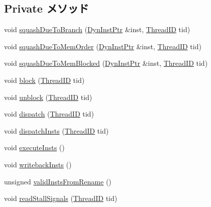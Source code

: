 \subsection*{Private メソッド}
\begin{DoxyCompactItemize}
\item 
void \hyperlink{classDefaultIEW_a7312a115c34dfbb21d18b6d85fc46fb9}{squashDueToBranch} (\hyperlink{classDefaultIEW_a028ce10889c5f6450239d9e9a7347976}{DynInstPtr} \&inst, \hyperlink{base_2types_8hh_ab39b1a4f9dad884694c7a74ed69e6a6b}{ThreadID} tid)
\item 
void \hyperlink{classDefaultIEW_a581b3c0199d9fc6283bdc7dbcab26e45}{squashDueToMemOrder} (\hyperlink{classDefaultIEW_a028ce10889c5f6450239d9e9a7347976}{DynInstPtr} \&inst, \hyperlink{base_2types_8hh_ab39b1a4f9dad884694c7a74ed69e6a6b}{ThreadID} tid)
\item 
void \hyperlink{classDefaultIEW_aa471ebd447a37d3bf56e80c6ce0373f5}{squashDueToMemBlocked} (\hyperlink{classDefaultIEW_a028ce10889c5f6450239d9e9a7347976}{DynInstPtr} \&inst, \hyperlink{base_2types_8hh_ab39b1a4f9dad884694c7a74ed69e6a6b}{ThreadID} tid)
\item 
void \hyperlink{classDefaultIEW_a0c1ca72524d2661cee99b06f2ba54de7}{block} (\hyperlink{base_2types_8hh_ab39b1a4f9dad884694c7a74ed69e6a6b}{ThreadID} tid)
\item 
void \hyperlink{classDefaultIEW_a2c95e7e16c04d20ba742b9e97a4f0809}{unblock} (\hyperlink{base_2types_8hh_ab39b1a4f9dad884694c7a74ed69e6a6b}{ThreadID} tid)
\item 
void \hyperlink{classDefaultIEW_ae7e149739c0db3dcb5d49119bd675ee2}{dispatch} (\hyperlink{base_2types_8hh_ab39b1a4f9dad884694c7a74ed69e6a6b}{ThreadID} tid)
\item 
void \hyperlink{classDefaultIEW_ada6ba514c48bb66235f0e4dba539b393}{dispatchInsts} (\hyperlink{base_2types_8hh_ab39b1a4f9dad884694c7a74ed69e6a6b}{ThreadID} tid)
\item 
void \hyperlink{classDefaultIEW_a2d00e30d66a56e4667e28df302c98ac0}{executeInsts} ()
\item 
void \hyperlink{classDefaultIEW_a5e9a203f943b3a8a243ddc6d2a0a240d}{writebackInsts} ()
\item 
unsigned \hyperlink{classDefaultIEW_a5fc3225c48aefdbd7d923903a3aa5bc6}{validInstsFromRename} ()
\item 
void \hyperlink{classDefaultIEW_ad65c9f053a6038ac8c34c34bfe9a88c3}{readStallSignals} (\hyperlink{base_2types_8hh_ab39b1a4f9dad884694c7a74ed69e6a6b}{ThreadID} tid)
\item 

\end{DoxyCompactItemize}
